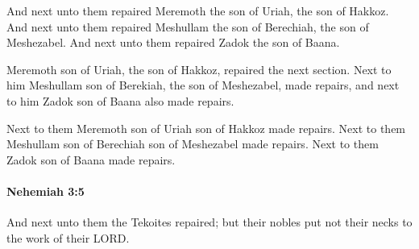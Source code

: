 			\begin{versebox}
					\item[BHS] 
					\item[LXX] 
					\item[ASV] And next unto them repaired Meremoth the son of Uriah, the son of Hakkoz. And next unto them repaired Meshullam the son of Berechiah, the son of Meshezabel. And next unto them repaired Zadok the son of Baana.
					\item[NIV] Meremoth son of Uriah, the son of Hakkoz, repaired the next section. Next to him Meshullam son of Berekiah, the son of Meshezabel, made repairs, and next to him Zadok son of Baana also made repairs.
					\item[NRSV] Next to them Meremoth son of Uriah son of Hakkoz made repairs. Next to them Meshullam son of Berechiah son of Meshezabel made repairs. Next to them Zadok son of Baana made repairs.
			\end{versebox}

		\paragraph{Nehemiah 3:5} %
			\label{NEHEMIAH-3-5}

			And next unto them the Tekoites repaired; but their nobles put not their necks to the work of their LORD.

